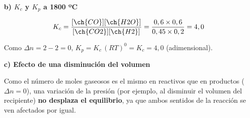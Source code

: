 \begin{exerciseEVAU}
\begin{solu}
        \textbf{b) \(K_c\) y \(K_p\) a 1800 ºC}

        \begin{equation*}
            K_c = \dfrac{[\ch{CO}][\ch{H2O}]}{[\ch{CO2}][\ch{H2}]} = \dfrac{0,6 \times 0,6}{0,45 \times 0,2} = 4,0
        \end{equation*}

        Como \(\Delta n = 2 - 2 = 0\), \(K_p = K_c\, (RT)^0 = K_c = 4,0\) (adimensional).

        \textbf{c) Efecto de una disminución del volumen}

        Como el número de moles gaseosos es el mismo en reactivos que en productos (\(\Delta n = 0\)), una variación de la presión (por ejemplo, al disminuir el volumen del recipiente) \textbf{no desplaza el equilibrio}, ya que ambos sentidos de la reacción se ven afectados por igual.

    \end{solu}
\end{exerciseEVAU}


